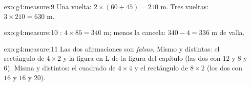 \begin{solution}{exo:g4:measure:9}
Una vuelta: $2 \times (60 + 45) = 210$ m. Tres vueltas:
$3 \times 210 = 630$ m.
\end{solution}

\begin{solution}{exo:g4:measure:10}
: $4 \times 85 = 340$ m; menos la cancela:
$340 - 4 = 336$ m de valla.
\end{solution}

\begin{solution}{exo:g4:measure:11}
Las dos afirmaciones son \emph{falsas}. Mismo  y  distintas: el
rectángulo de $4 \times 2$ y la figura en L de la figura del capítulo (las dos con
 $12$ y  $8$ y $6$). Misma  y 
distintos: el cuadrado de $4 \times 4$ y el rectángulo de $8 \times 2$
(los dos con  $16$ y  $16$ y $20$).
\end{solution}

